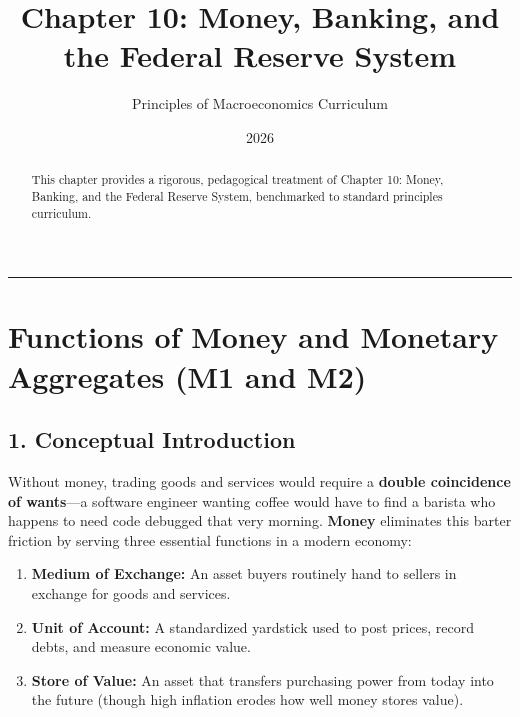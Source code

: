 \documentclass[11pt,letterpaper]{article}
\begin{document}
\title{\Huge\bfseries\color{SlateBlue} Chapter 10: Money, Banking, and the Federal Reserve System}
\author{\large Principles of Macroeconomics Curriculum}
\date{2026}
\maketitle

\thispagestyle{plain}

\begin{abstract}
This chapter provides a rigorous, pedagogical treatment of Chapter 10: Money, Banking, and the Federal Reserve System, benchmarked to standard principles curriculum.
\end{abstract}

\tableofcontents
\vspace{1.5em}
\hrule
\vspace{1.5em}

\section{Functions of Money and Monetary Aggregates (M1 and M2)}

\subsection*{1. Conceptual Introduction}
Without money, trading goods and services would require a \textbf{double coincidence of wants}—a software engineer wanting coffee would have to find a barista who happens to need code debugged that very morning. \textbf{Money} eliminates this barter friction by serving three essential functions in a modern economy:
\begin{enumerate}
    \item \textbf{Medium of Exchange:} An asset buyers routinely hand to sellers in exchange for goods and services.
    \item \textbf{Unit of Account:} A standardized yardstick used to post prices, record debts, and measure economic value.
    \item \textbf{Store of Value:} An asset that transfers purchasing power from today into the future (though high inflation erodes how well money stores value).
\end{enumerate}
\end{document}
